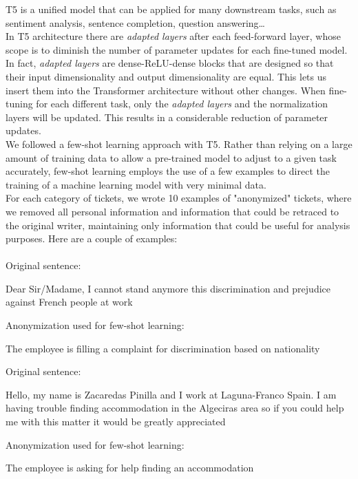 T5 is a unified model that can be applied for many downstream tasks, such as sentiment analysis, sentence completion, question answering\dots\\
In T5 architecture there are \textit{adapted layers} after each feed-forward layer, whose scope is to diminish the number of parameter updates for each fine-tuned model. In fact, \textit{adapted layers} are dense-ReLU-dense blocks that are designed so that their input dimensionality and output dimensionality are equal. This lets us insert them into the Transformer architecture without other changes. When fine-tuning for each different task, only the \textit{adapted layers} and the normalization layers will be updated. This results in a considerable reduction of parameter updates.\\
We followed a few-shot learning approach with T5. Rather than relying on a large amount of training data to allow a pre-trained model to adjust to a given task accurately, few-shot learning employs the use of a few examples to direct the training of a machine learning model with very minimal data. \\
For each category of tickets, we wrote 10 examples of "anonymized" tickets, where we removed all personal information and information that could be retraced to the original writer, maintaining only information that could be useful for analysis purposes.
Here are a couple of examples:\\ \\
Original sentence:
\begin{adjustwidth}{1cm}{}
    Dear Sir/Madame, I cannot stand anymore this discrimination and prejudice against French people at work
\end{adjustwidth}
Anonymization used for few-shot learning:
\begin{adjustwidth}{1cm}{}
    The employee is filling a complaint for discrimination based on nationality 
\end{adjustwidth}
Original sentence:
\begin{adjustwidth}{1cm}{}
    Hello, my name is Zacaredas Pinilla and I work at Laguna-Franco Spain. I am having trouble finding accommodation in the Algeciras area so if you could help me with this matter it would be greatly appreciated
\end{adjustwidth}
Anonymization used for few-shot learning:
\begin{adjustwidth}{1cm}{}
    The employee is asking for help finding an accommodation
\end{adjustwidth}
